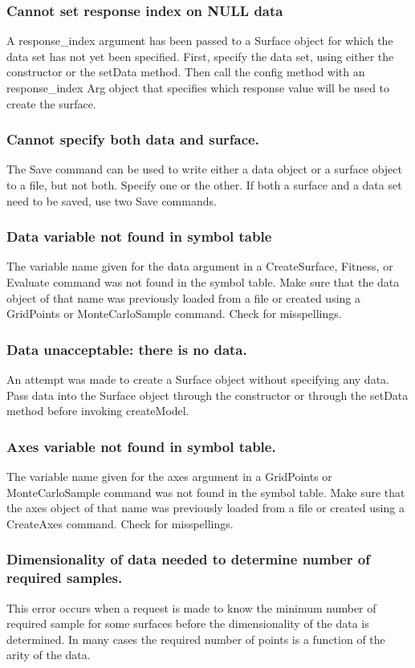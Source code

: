 \documentclass{article}
\begin{document}
\subsubsection{Cannot set response index on NULL data }
A response\_index argument has been passed to a Surface object for which the
data set has not yet been specified.  First, specify the data set, using either
the constructor or the setData method.  Then call the config method with an
response\_index Arg object that specifies which response value will be used to
create the surface.

\subsubsection{Cannot specify both data and surface.}
The Save command can be used to write either a data object or a surface object
to a file, but not both.  Specify one or the other.  If both a surface and a
data set need to be saved, use two Save commands.

\subsubsection{Data variable not found in symbol table}
The variable name given for the data argument in a CreateSurface, Fitness, or
Evaluate command was not found in the symbol table.  Make sure that the data
object of that name was previously loaded from a file or created using a
GridPoints or MonteCarloSample command.  Check for misspellings.

\subsubsection{Data unacceptable: there is no data.}
An attempt was made to create a Surface object without specifying any data.
Pass data into the Surface object through the constructor or through the setData
method before invoking createModel.

\subsubsection{Axes variable not found in symbol table.}
The variable name given for the axes argument in a GridPoints or
MonteCarloSample command was not found in the symbol table.  Make sure that the
axes object of that name was previously loaded from a file or created using a
CreateAxes command.  Check for misspellings.

\subsubsection{Dimensionality of data needed to determine number of required samples.}
This error occurs when a request is made to know the minimum number of required
sample for some surfaces before the dimensionality of the data is determined.
In many cases the required number of points is a function of the arity of the
data.
\end{document}
